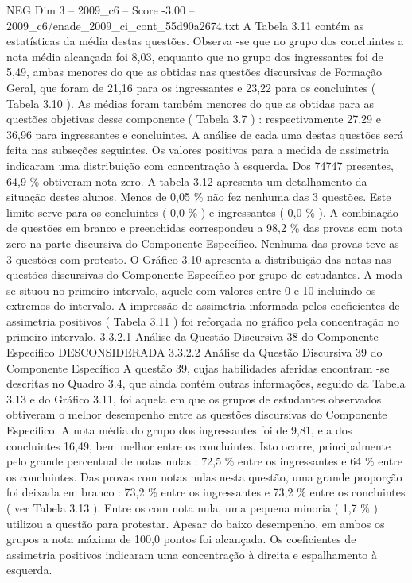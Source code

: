\begin{textsample}{NEG Dim 3 – 2009\_c6 – Score -3.00 – 2009\_c6/enade\_2009\_ci\_cont\_55d90a2674.txt}
A Tabela 3.11 contém as estatísticas da média destas questões.
Observa -se que no grupo dos concluintes a nota média alcançada foi 8,03, enquanto que no grupo dos ingressantes foi de 5,49, ambas menores do que as obtidas nas questões discursivas de Formação Geral, que foram de 21,16 para os ingressantes e 23,22 para os concluintes ( Tabela 3.10 ).
As médias foram também menores do que as obtidas para as questões objetivas desse componente ( Tabela 3.7 ) : respectivamente 27,29 e 36,96 para ingressantes e concluintes.
A análise de cada uma destas questões será feita nas subseções seguintes.
Os valores positivos para a medida de assimetria indicaram uma distribuição com concentração à esquerda.
Dos 74747 presentes, 64,9 \% obtiveram nota zero.
A tabela 3.12 apresenta um detalhamento da situação destes alunos.
Menos de 0,05 \% não fez nenhuma das 3 questões.
Este limite serve para os concluintes ( 0,0 \% ) e ingressantes ( 0,0 \% ).
A combinação de questões em branco e preenchidas correspondeu a 98,2 \% das provas com nota zero na parte discursiva do Componente Específico.
Nenhuma das provas teve as 3 questões com protesto.
O Gráfico 3.10 apresenta a distribuição das notas nas questões discursivas do Componente Específico por grupo de estudantes.
A moda se situou no primeiro intervalo, aquele com valores entre 0 e 10 incluindo os extremos do intervalo.
A impressão de assimetria informada pelos coeficientes de assimetria positivos ( Tabela 3.11 ) foi reforçada no gráfico pela concentração no primeiro intervalo. 3.3.2.1 Análise da Questão Discursiva 38 do Componente Específico DESCONSIDERADA 3.3.2.2 Análise da Questão Discursiva 39 do Componente Específico A questão 39, cujas habilidades aferidas encontram -se descritas no Quadro 3.4, que ainda contém outras informações, seguido da Tabela 3.13 e do Gráfico 3.11, foi aquela em que os grupos de estudantes observados obtiveram o melhor desempenho entre as questões discursivas do Componente Específico.
A nota média do grupo dos ingressantes foi de 9,81, e a dos concluintes 16,49, bem melhor entre os concluintes.
Isto ocorre, principalmente pelo grande percentual de notas nulas : 72,5 \% entre os ingressantes e 64 \% entre os concluintes.
Das provas com notas nulas nesta questão, uma grande proporção foi deixada em branco : 73,2 \% entre os ingressantes e 73,2 \% entre os concluintes ( ver Tabela 3.13 ).
Entre os com nota nula, uma pequena minoria ( 1,7 \% ) utilizou a questão para protestar.
Apesar do baixo desempenho, em ambos os grupos a nota máxima de 100,0 pontos foi alcançada.
Os coeficientes de assimetria positivos indicaram uma concentração à direita e espalhamento à esquerda.

\end{textsample}
